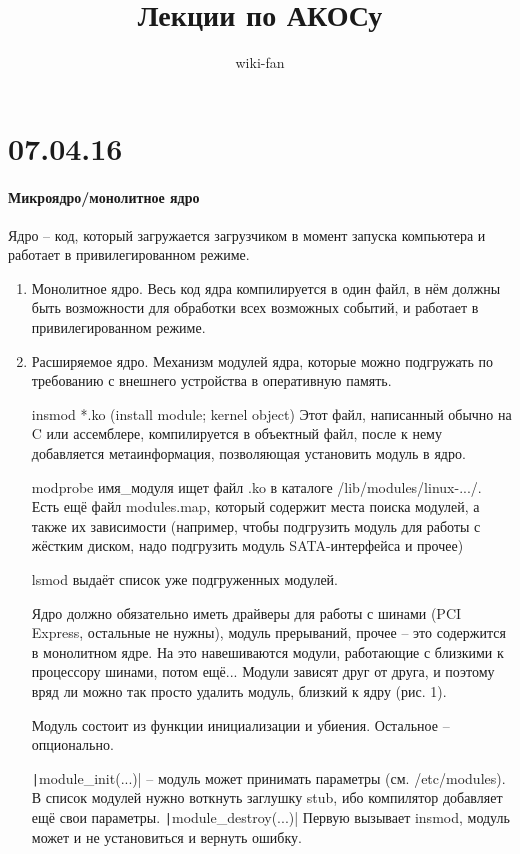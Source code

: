 \documentclass[a4paper,10pt]{article}
\author{wiki-fan}
\title{\textbf{Лекции по АКОСу}}
\newcommand{\ci}{\texttt}
\begin{document}
\maketitle

\section{07.04.16}
\paragraph{Микроядро/монолитное ядро}
Ядро -- код, который загружается загрузчиком в момент запуска компьютера и работает в привилегированном режиме.
\begin{enumerate}
\item Монолитное ядро. Весь код ядра компилируется в один файл, в нём должны быть возможности для обработки всех возможных событий, и работает в привилегированном режиме.
\item Расширяемое ядро. Механизм модулей ядра, которые можно подгружать по требованию с внешнего устройства в оперативную память.

insmod *.ko (install module; kernel object)
Этот файл, написанный обычно на C или ассемблере, компилируется в объектный файл, после к нему добавляется метаинформация, позволяющая установить модуль в ядро.

modprobe имя\_модуля ищет файл .ko в каталоге /lib/modules/linux-.../. Есть ещё файл modules.map, который содержит места поиска модулей, а также их зависимости (например, чтобы подгрузить модуль для работы с жёстким диском, надо подгрузить модуль SATA-интерфейса и прочее)

lsmod выдаёт список уже подгруженных модулей.

Ядро должно обязательно иметь драйверы для работы с шинами (PCI Express, остальные не нужны), модуль прерываний, прочее -- это содержится в монолитном ядре. На это навешиваются модули, работающие с близкими к процессору шинами, потом ещё... Модули зависят друг от друга, и поэтому вряд ли можно так просто удалить модуль, близкий к ядру (рис. 1).

Модуль состоит из функции инициализации и убиения. Остальное -- опционально.

\ci|module_init(...)| -- модуль может принимать параметры (см. /etc/modules).
В список модулей нужно воткнуть заглушку stub, ибо компилятор добавляет ещё свои параметры.
\ci|module_destroy(...)|
Первую вызывает insmod, модуль может и не установиться и вернуть ошибку.


\end{enumerate}
\end{document}
